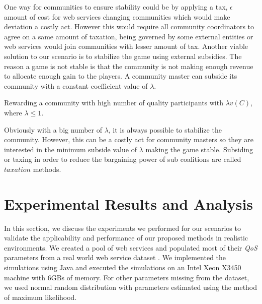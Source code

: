\documentclass[10pt,journal,cspaper,compsoc]{IEEEtran}
\begin{document}
One way for communities to ensure  stability could be  by applying a tax, $\epsilon$ amount of cost for web services changing communities which would make deviation a costly act. However this would require all community coordinators to agree on a same amount of taxation, being governed by some external entities or web services would join communities with lesser amount of tax. Another viable solution to our scenario is to stabilize the game using external subsidies. The reason a game is not stable is that the community is not making enough revenue to allocate  enough gain to the players. A community master can subside its community with a constant coefficient value of $\lambda$.

Rewarding a community with high number of quality participants with $\lambda v(C)$, where $\lambda \leq 1$.

Obviously with a big number of $\lambda$, it is always possible to stabilize the community. However, this can be a costly act for community masters so they are interested in the minimum subside value of $\lambda$ making the game stable. Subsiding or taxing in order to reduce the bargaining power of sub coalitions are called $taxation$ \cite{eps346856} methods.






\section{Experimental Results and Analysis}\label{s:resutls}

In this section, we discuss the experiments we performed for our
scenarios to validate the applicability and performance of our
proposed methods in realistic environments. We created a pool of
web services and populated most of their \emph{QoS} parameters
from a real world web service dataset
\cite{DBLP:conf/smc/Al-MasriM09a}. We implemented the simulations
using Java and executed the simulations on an Intel Xeon X3450
machine with 6GBs of memory. For other parameters missing from the
dataset, we used normal random distribution with parameters
estimated using the method of maximum likelihood.
\end{document}
